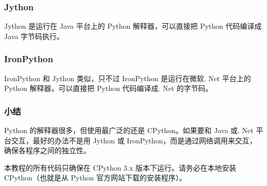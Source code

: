 \hypertarget{jython}{%
\subsubsection{Jython}\label{jython}}

Jython 是运行在 Java 平台上的 Python 解释器，可以直接把 Python
代码编译成 Java 字节码执行。

\hypertarget{ironpython}{%
\subsubsection{IronPython}\label{ironpython}}

IronPython 和 Jython 类似，只不过 IronPython 是运行在微软. Net 平台上的
Python 解释器，可以直接把 Python 代码编译成. Net 的字节码。

\hypertarget{ux5c0fux7ed3}{%
\subsubsection{小结}\label{ux5c0fux7ed3}}

Python 的解释器很多，但使用最广泛的还是 CPython。如果要和 Java 或. Net
平台交互，最好的办法不是用 Jython 或
IronPython，而是通过网络调用来交互，确保各程序之间的独立性。

本教程的所有代码只确保在 CPython 3.x 版本下运行。请务必在本地安装
CPython（也就是从 Python 官方网站下载的安装程序）。

